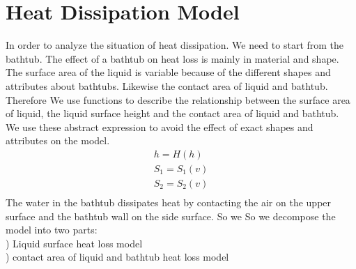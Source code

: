 \documentclass{mcmthesis}
\begin{document}
\section{Heat Dissipation Model}
In order to analyze the situation of heat dissipation. 
We need to start from the bathtub.
The effect of a bathtub on heat loss is mainly in material and shape.\\
\indent The surface area of the liquid is variable because of the different shapes and attributes about bathtubs. Likewise the contact area of liquid and bathtub. Therefore We use functions to describe the relationship between the surface area of liquid, the liquid surface height and the contact area of liquid and bathtub. \\
\indent We use these abstract expression to avoid the effect of exact shapes and attributes on the model.
\begin{equation}
\begin{split}
h=H(h)  \\
S_{1}=S_{1}(v) \\
S_{2}=S_{2}(v)  \\
\end{split}
\end{equation}
\indent The water in the bathtub dissipates heat by contacting the air on the upper surface and the bathtub wall on the side surface. So we So we decompose the model into two parts:\\
\indent {}) Liquid surface heat loss model\\
\indent {}) contact area of liquid and bathtub heat loss model
\end{document}
